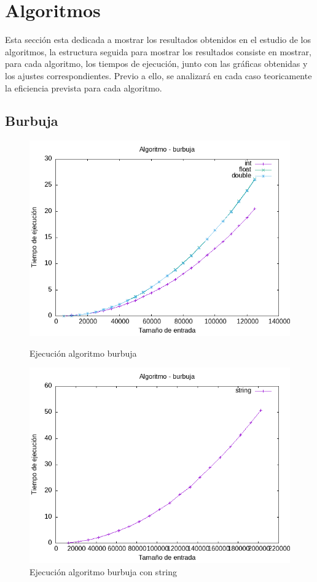 \documentclass[11pt]{article}
\begin{document}
\section{Algoritmos}
Esta sección esta dedicada a mostrar los resultados obtenidos en el estudio de los algoritmos,
la estructura seguida para mostrar los resultados consiste en mostrar, para cada algoritmo, los tiempos 
de ejecución, junto con las gráficas obtenidas y los ajustes correspondientes. Previo a ello, se analizará
en cada caso teoricamente la eficiencia prevista para cada algoritmo.

\subsection{Burbuja}
\begin{figure}[H]
    \begin{minipage}{0.5\textwidth}
        \centering
        \includegraphics[width=\linewidth]{assets/Img/burbuja.png}
        \caption{Ejecución algoritmo burbuja}
        \label{fig:burbuja}
    \end{minipage}%
    \begin{minipage}{0.5\textwidth}
        \centering
        \includegraphics[width=\linewidth]{assets/Img/burbujastring.png}
        \caption{Ejecución algoritmo burbuja con string}
        \label{fig:burbujastring}
    \end{minipage}
\end{figure}
\end{document}
